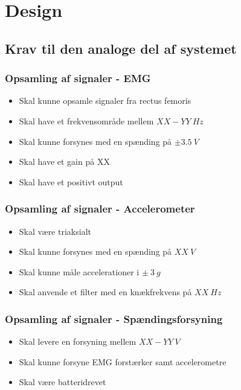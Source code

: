 \section{Design}

\subsection{Krav til den analoge del af systemet}

\subsubsection{Opsamling af signaler - EMG}
\begin{itemize}
\item Skal kunne opsamle signaler fra rectus femoris
\item Skal have et frekvensområde mellem $XX-YY~Hz$
\item Skal kunne forsynes med en spænding på $\pm3.5~V$ 
\item Skal have et gain på XX
\item Skal have et positivt output
\end{itemize}

\subsubsection{Opsamling af signaler - Accelerometer}
\begin{itemize}
\item Skal være triaksialt 
\item Skal kunne forsynes med en spænding på $XX~V$
\item Skal kunne måle accelerationer i $\pm~3~g$
\item Skal anvende et filter med en knækfrekvens på $XX~Hz$
\end{itemize}

\subsubsection{Opsamling af signaler - Spændingsforsyning}
\begin{itemize}
\item Skal levere en forsyning mellem $XX-YY~V$
\item Skal kunne forsyne EMG forstærker samt accelerometre 
\item Skal være batteridrevet
\end{itemize}

